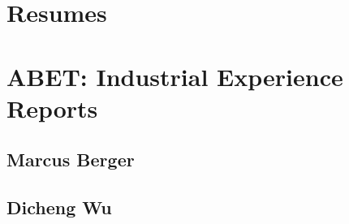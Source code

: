 

\section{Resumes}



%     

\section{ABET: Industrial Experience Reports}

\subsection{Marcus Berger}

% 

\subsection{Dicheng Wu}

% 


